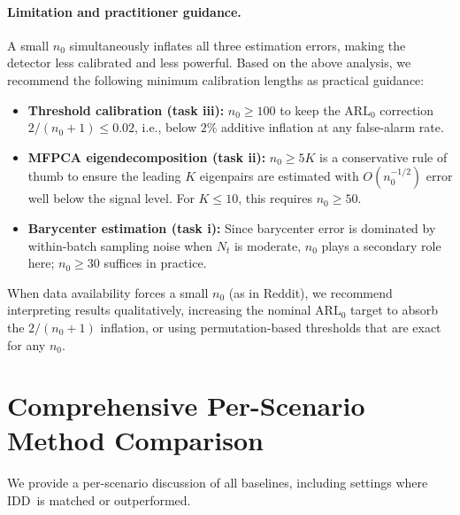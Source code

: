 \documentclass{article}
\newcommand{\algoname}{\textsc{IDD}\xspace}
\theoremstyle{plain}
\theoremstyle{definition}
\theoremstyle{remark}
\begin{document}
\paragraph{Limitation and practitioner guidance.}
A small $n_0$ simultaneously inflates all three estimation errors, making the detector less calibrated and less powerful. Based on the above analysis, we recommend the following minimum calibration lengths as practical guidance:
\begin{itemize}
  \item \textbf{Threshold calibration (task iii):} $n_0 \ge 100$ to keep the $\mathrm{ARL}_0$ correction $2/(n_0+1) \le 0.02$, i.e., below $2\%$ additive inflation at any false-alarm rate.
  \item \textbf{MFPCA eigendecomposition (task ii):} $n_0 \ge 5K$ is a conservative rule of thumb to ensure the leading $K$ eigenpairs are estimated with $O(n_0^{-1/2})$ error well below the signal level. For $K \le 10$, this requires $n_0 \ge 50$.
  \item \textbf{Barycenter estimation (task i):} Since barycenter error is dominated by within-batch sampling noise when $N_t$ is moderate, $n_0$ plays a secondary role here; $n_0 \ge 30$ suffices in practice.
\end{itemize}
When data availability forces a small $n_0$ (as in Reddit), we recommend interpreting results qualitatively, increasing the nominal $\mathrm{ARL}_0$ target to absorb the $2/(n_0+1)$ inflation, or using permutation-based thresholds that are exact for any $n_0$.

\section{Comprehensive Per-Scenario Method Comparison}\label{app:method_discussion}
We provide a per-scenario discussion of all baselines, including settings where \algoname\ is matched or outperformed.
\end{document}
